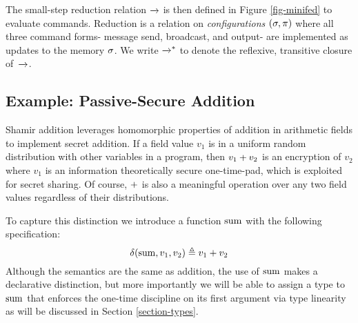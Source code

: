 The small-step reduction relation $\xrightarrow{}$ is then defined in Figure
\ref{fig-minifed} to evaluate commands. Reduction is a relation on
\emph{configurations} $(\sigma, \pi)$ where all three command forms-
message send, broadcast, and output- are implemented as updates to the
memory $\sigma$. We write $\xrightarrow{}^{*}$ to denote the reflexive, transitive
closure of\ $\xrightarrow{}$. 

\subsection{Example: Passive-Secure Addition}

Shamir addition leverages homomorphic properties of addition in
arithmetic fields to implement secret addition. If a field value $v_1$
is in a uniform random distribution with other variables in a program,
then $v_1 + v_2$ is an encryption of $v_2$ where $v_1$ is an
information theoretically secure one-time-pad, which is exploited for
secret sharing. Of course, $+$ is also a meaningful operation
over any two field values regardless of their distributions.

To capture this distinction we introduce a function $\mathrm{sum}$
with the following specification:
$$
\delta(\mathrm{sum},v_1,v_2) \triangleq v_1 + v_2
$$
Although the semantics are the same as addition, the use of $\mathrm{sum}$
makes a declarative distinction, but more importantly we will be
able to assign a type to $\mathrm{sum}$ that enforces the one-time discipline
on its first argument via type linearity as will be discussed in Section
\ref{section-types}.


